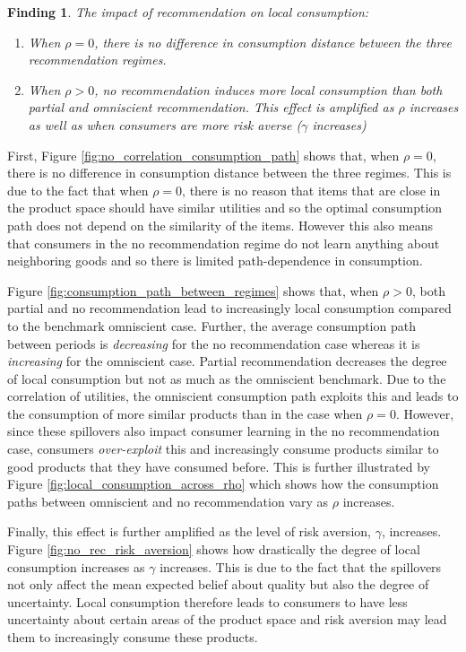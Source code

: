 \documentclass[sigconf]{acmart}
\newtheorem{finding}{Finding}
\begin{document}
\begin{finding}\label{finding_local_consumption}
The impact of recommendation on local consumption:
\begin{enumerate}
\item When $\rho = 0$, there is no difference in consumption distance between the three recommendation regimes.
\item When $\rho > 0$, no recommendation induces more local consumption than both partial and omniscient recommendation. This effect is amplified as $\rho$ increases as well as when consumers are more risk averse ($\gamma$ increases)
\end{enumerate}
\end{finding}

First, Figure \ref{fig:no_correlation_consumption_path} shows that, when $\rho = 0$, there is no difference in consumption distance between the three regimes. This is due to the fact that when $\rho = 0$, there is no reason that items that are close in the product space should have similar utilities and so the optimal consumption path does not depend on the similarity of the items. However this also means that consumers in the no recommendation regime do not learn anything about neighboring goods and so there is limited path-dependence in consumption.

Figure \ref{fig:consumption_path_between_regimes} shows that, when $\rho > 0$, both partial and no recommendation lead to increasingly local consumption compared to the benchmark omniscient case. Further, the average consumption path between periods is \textit{decreasing} for the no recommendation case whereas it is \textit{increasing} for the omniscient case. Partial recommendation decreases the degree of local consumption but not as much as the omniscient benchmark. Due to the correlation of utilities, the omniscient consumption path exploits this and leads to the consumption of more similar products than in the case when $\rho = 0$. However, since these spillovers also impact consumer learning in the no recommendation case, consumers \textit{over-exploit} this and increasingly consume products similar to good products that they have consumed before. This is further illustrated by Figure \ref{fig:local_consumption_across_rho} which shows how the consumption paths between omniscient and no recommendation vary as $\rho$ increases.

Finally, this effect is further amplified as the level of risk aversion, $\gamma$, increases. Figure \ref{fig:no_rec_risk_aversion} shows how drastically the degree of local consumption increases as $\gamma$ increases. This is due to the fact that the spillovers not only affect the mean expected belief about quality but also the degree of uncertainty. Local consumption therefore leads to consumers to have less uncertainty about certain areas of the product space and risk aversion may lead them to increasingly consume these products.
\end{document}
